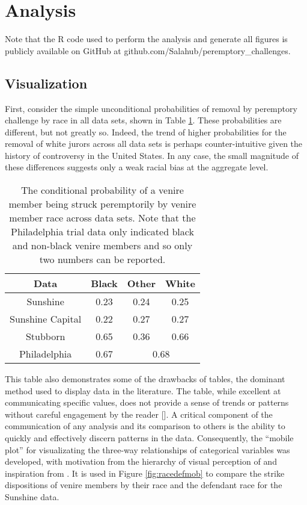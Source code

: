 \section{Analysis} \label{c:analysis}

Note that the R code used to perform the analysis and generate all
figures is publicly available on GitHub at github.com/Salahub/peremptory\_challenges.

\subsection{Visualization} \label{sec:visual}

First, consider the simple unconditional probabilities of
removal by peremptory challenge by race in all data sets, shown in
Table \ref{tab:margrace}. These probabilities are different, but not greatly so. Indeed, the trend of higher probabilities for the removal of white jurors
across all data sets is perhaps counter-intuitive given the history of controversy in the United States. In any case, the small
magnitude of these differences suggests only a weak racial bias at the aggregate level.

\begin{table}[h!]
  \centering
  \caption[Strike Rate by Race]{\footnotesize The conditional probability of a venire member being struck peremptorily by venire member race across data sets. Note that the Philadelphia trial data only
    indicated black and non-black venire members and so only two numbers can be reported.} \label{tab:margrace}
  \begin{tabular}{|c|c c c|} \hline
    Data & Black & Other & White \\ \hline
    Sunshine & 0.23 & 0.24 & 0.25 \\
    Sunshine Capital & 0.22 & 0.27 & 0.27 \\
    Stubborn & 0.65 & 0.36 & 0.66 \\ 
    Philadelphia & 0.67 & \multicolumn{2}{c|}{0.68} \\ \hline
  \end{tabular}
\end{table}

This table also demonstrates some of the drawbacks of tables, the
dominant method used to display data in the literature. The table, while excellent at communicating specific
values, does not provide a sense of trends or patterns without careful
engagement by the reader [\cite{tukeywilk1966}]. A critical component of the
communication of any analysis and its comparison to others is the ability to quickly and effectively discern patterns in the data. Consequently, the ``mobile plot'' for visualizating the three-way relationships of categorical variables was
developed, with motivation from the hierarchy of visual perception of
\cite{cleveland1987} and inspiration from
\cite{VisualDisplayQuant}. It is used in Figure \ref{fig:racedefmob}
to compare the strike dispositions of venire members by their race and the defendant race for the Sunshine data.

